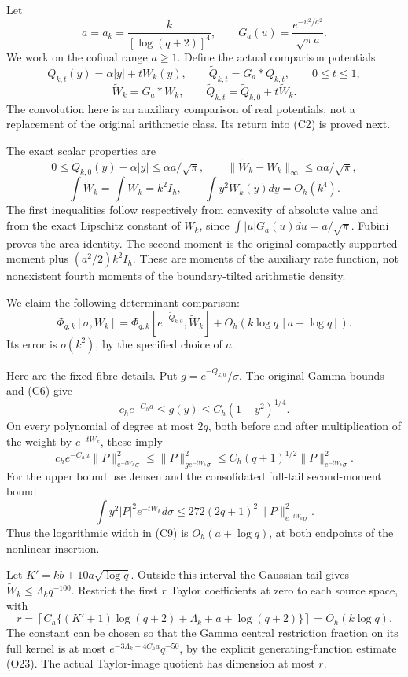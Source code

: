 Let \[
a=a_k=\frac{k}{[\log(q+2)]^4},\qquad
G_a(u)=\frac{e^{-u^2/a^2}}{\sqrt\pi a}.
\] We work on the cofinal range \(a\ge1\). Define the actual comparison
potentials \[
Q_{k,t}(y)=\alpha|y|+tW_k(y),\qquad
\widetilde Q_{k,t}=G_a*Q_{k,t},\qquad0\le t\le1,
\] \[
\widetilde W_k=G_a*W_k,
\qquad \widetilde Q_{k,t}=\widetilde Q_{k,0}+t\widetilde W_k.
\tag{C5}
\] The convolution here is an auxiliary comparison of real potentials,
not a replacement of the original arithmetic class. Its return into (C2)
is proved next.

The exact scalar properties are \[
0\le\widetilde Q_{k,0}(y)-\alpha|y|\le\alpha a/\sqrt\pi,
\qquad
\|\widetilde W_k-W_k\|_\infty\le\alpha a/\sqrt\pi,
\tag{C6}
\] \[
\int\widetilde W_k=\int W_k=k^2I_h,
\qquad
\int y^2\widetilde W_k(y)dy=O_h(k^4).
\tag{C7}
\] The first inequalities follow respectively from convexity of absolute
value and from the exact Lipschitz constant of \(W_k\), since
\(\int|u|G_a(u)du=a/\sqrt\pi\). Fubini proves the area identity. The
second moment is the original compactly supported moment plus
\((a^2/2)k^2I_h\). These are moments of the auxiliary rate function, not
nonexistent fourth moments of the boundary-tilted arithmetic density.

We claim the following determinant comparison: \[
\boxed{\Phi_{q,k}[\sigma,W_k]
=\Phi_{q,k}[e^{-\widetilde Q_{k,0}},\widetilde W_k]
+O_h\!\left(k\log q\,[a+\log q]\right).}\tag{C8}
\] Its error is \(o(k^2)\), by the specified choice of \(a\).

Here are the fixed-fibre details. Put
\(g=e^{-\widetilde Q_{k,0}}/\sigma\). The original Gamma bounds and (C6)
give \[
c_he^{-C_ha}\le g(y)\le C_h(1+y^2)^{1/4}.
\] On every polynomial of degree at most \(2q\), both before and after
multiplication of the weight by \(e^{-tW_k}\), these imply \[
c_he^{-C_ha}\|P\|_{e^{-tW_k}\sigma}^2
\le\|P\|_{g e^{-tW_k}\sigma}^2
\le C_h(q+1)^{1/2}\|P\|_{e^{-tW_k}\sigma}^2.
\tag{C9}
\] For the upper bound use Jensen and the consolidated full-tail
second-moment bound \[
\int y^2|P|^2e^{-tW_k}d\sigma\le272(2q+1)^2\|P\|_{e^{-tW_k}\sigma}^2.
\] Thus the logarithmic width in (C9) is \(O_h(a+\log q)\), at both
endpoints of the nonlinear insertion.

Let \(K'=kb+10a\sqrt{\log q}\). Outside this interval the Gaussian tail
gives \(\widetilde W_k\le\Lambda_k q^{-100}\). Restrict the first \(r\)
Taylor coefficients at zero to each source space, with \[
r=\left\lceil C_h\{(K'+1)\log(q+2)+\Lambda_k+a+\log(q+2)\}\right\rceil
=O_h(k\log q).
\tag{C10}
\] The constant can be chosen so that the Gamma central restriction
fraction on its full kernel is at most \(e^{-3\Lambda_k-4C_ha}q^{-50}\),
by the explicit generating-function estimate (O23). The actual
Taylor-image quotient has dimension at most \(r\).

